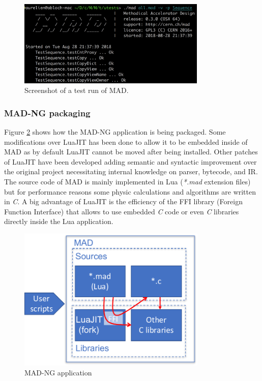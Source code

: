 \begin{figure}[H]
    \centering
	\includegraphics[width=0.8\textwidth]{./Images/mad-screenshot}
    \caption{Screenshot of a test run of MAD.}
    \label{fig:mad-screnshot}
\end{figure}

\subsubsection{MAD-NG packaging}
\label{Subsec:mad-pk}

Figure \ref{fig:mad} shows how the MAD-NG application is being packaged. Some
modifications over LuaJIT has been done to allow it to be embedded inside of MAD
as by default LuaJIT cannot be moved after being installed. Other patches of
LuaJIT have been developed adding semantic and syntactic improvement over the
original project necessitating internal knowledge on parser, bytecode, and IR.
The source code of MAD is mainly implemented in Lua (\emph{*.mad} extension
files) but for performance reasons some physic calculations and algorithms are
written in \emph{C}. A big advantage of LuaJIT is the efficiency of the FFI
library (Foreign Function Interface) that allows to use embedded \emph{C} code
or even \emph{C} libraries directly inside the Lua application.

\begin{figure}[H]
    \centering
	\includegraphics[width=9cm]{./Images/MAD.pdf}
    \caption{MAD-NG application}
    \label{fig:mad}
\end{figure}

